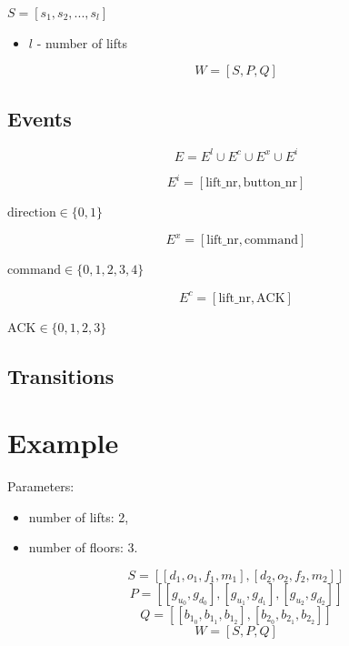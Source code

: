 \documentclass{article}
\begin{document}
\(S=[s_1, s_2, ..., s_l]\)
\begin{itemize}
  \item \(l\) - number of lifts
\end{itemize}

\[
W = [S, P, Q]
\]

\subsection{Events}

\[
E = E^l \cup E^c \cup E^x \cup E^i
\]

\[
E^i = [\text{lift\_nr},\text{button\_nr}]
\]

\(\text{direction} \in \{0,1\}\)

\[
E^x = [\text{lift\_nr}, \text{command}]
\]

\(\text{command} \in \{0,1,2,3,4\}\)

\[
E^c = [\text{lift\_nr}, \text{ACK}]
\]

\(\text{ACK} \in \{0,1,2,3\}\)

\subsection{Transitions}

\section{Example}

Parameters:
\begin{itemize}
  \item number of lifts: 2,
  \item number of floors: 3.
\end{itemize}

\[
S = [ [d_1, o_1, f_1, m_1], [d_2, o_2, f_2, m_2] ]
\]
\[
P = [ [g_{u_0}, g_{d_0}], [g_{u_1}, g_{d_1}], [g_{u_2}, g_{d_2}] ]
\]
\[
Q = [ [b_{1_0},b_{1_1},b_{1_2}], [b_{2_0},b_{2_1},b_{2_2}] ]
\]
\[
W=[S,P,Q]
\]
\end{document}
